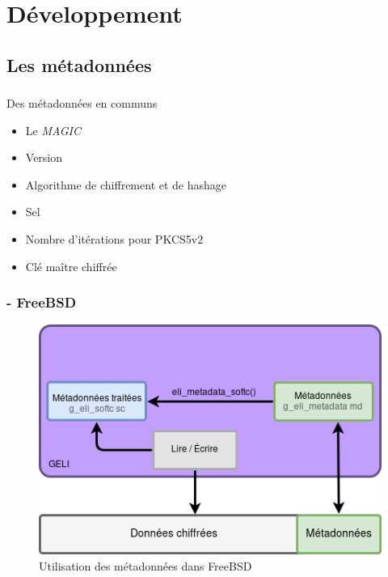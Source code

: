 \section{Développement}

\subsection{Les métadonnées}

\begin{frame}
	\frametitle{\insertsubsectionhead}
	\begin{block}{Des métadonnées en communs}
		\begin{itemize}
		\item Le \textit{MAGIC}
		\item Version
		\item Algorithme de chiffrement et de hashage
		\item Sel
		\item Nombre d'itérations pour PKCS5v2
		\item Clé maître chiffrée
		\end{itemize}
	\end{block}
\end{frame}

\begin{frame}
	\frametitle{\insertsubsectionhead - \textbf{FreeBSD}}
	\begin{figure}
		\includegraphics[width=.8\textwidth]{developpement/utilisation_metadonnee}
		\caption{Utilisation des métadonnées dans FreeBSD}
	\end{figure}
\end{frame}

